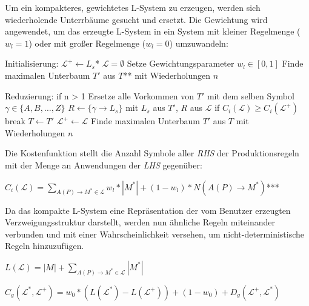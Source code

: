 \newpage

Um ein kompakteres, gewichtetes L-System zu erzeugen, werden sich wiederholende Unterrbäume gesucht und ersetzt.
Die Gewichtung wird angewendet, um das erzeugte L-System in ein System mit kleiner Regelmenge ($w_l=1$) oder mit
großer Regelmenge ($w_l=0$) umzuwandeln:
\begin{algorithm}[caption={Erstellen eines kompakten L-Systems mit Gewichtung $w_l$}, label={alg3}]
Initialisierung:
$\mathcal{L}^+ \leftarrow L_s$*
$\mathcal{L}=\emptyset$
Setze Gewichtungsparameter $w_l \in [0,1]$
Finde maximalen Unterbaum $T'$ aus $T$** mit Wiederholungen $n$

Reduzierung:
if n > 1
Ersetze alle Vorkommen von $T'$ mit dem selben Symbol $\gamma \in \{A,B,\dots,Z\}$
$R \leftarrow \{\gamma \rightarrow L_s\}$ mit $L_s$ aus $T'$, $R$ aus $\mathcal{L}$
if $C_i(\mathcal{L}) \geq C_i(\mathcal{L}^+)$
break
$T \leftarrow T'$
$\mathcal{L}^+ \leftarrow \mathcal{L}$
Finde maximalen Unterbaum $T'$ aus $T$ mit Wiederholungen $n$
\end{algorithm}

Die Kostenfunktion stellt die Anzahl Symbole aller \textit{RHS} der Produktionsregeln mit der Menge an
Anwendungen der \textit{LHS} gegenüber:
\begin{algorithm}[caption={Kostenfunktion $C_i$ mit Gewichtung $w_l$}, label={alg4}]
$C_i(\mathcal{L})= \sum\limits_{A(P) \rightarrow M^* \in \mathcal{L}} w_l * |M^*| + (1 - w_l) * N(A(P)\rightarrow
M^*)$***
\end{algorithm}

Da das kompakte L-System eine Repräsentation der vom Benutzer erzeugten Verzweigungsstruktur darstellt, werden
nun ähnliche Regeln miteinander verbunden und mit einer Wahrscheinlichkeit versehen, um nicht-deterministische
Regeln hinzuzufügen.

\begin{algorithm}[caption={Längenfunktion $L$ für Grammatiken}, label={alg5}]
$L(\mathcal{L}) = |M| + \sum\limits_{A(P) \rightarrow M^* \in \mathcal{L}} |M^*|$
\end{algorithm}

\begin{algorithm}[caption={Kostenfunktion $C_g$ mit Gewichtung $w_0$}, label={alg6}]
$C_g(\mathcal{L}^*, \mathcal{L}^+) = w_0 * (L(\mathcal{L}^*) - L(\mathcal{L}^+)) + (1 - w_0) + D_g
(\mathcal{L}^+, \mathcal{L}^*)$
\end{algorithm}

